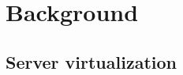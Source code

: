\let\textcircled=\pgftextcircled
\chapter{Background}
\label{chap:background}

\minitoc

\newpage    
\section{Server virtualization}